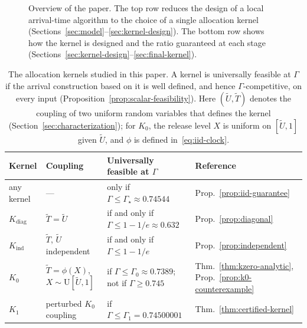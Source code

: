 \documentclass[11pt]{article}
\theoremstyle{definition}
\theoremstyle{remark}
\begin{document}
\begin{figure}[t]
\caption{Overview of the paper. The top row reduces the design of a local arrival-time
algorithm to the choice of a single allocation kernel (Sections~\ref{sec:model}--\ref{sec:kernel-design}). The
bottom row shows how the kernel is designed and the ratio guaranteed at each stage
(Sections~\ref{sec:kernel-design}--\ref{sec:final-kernel}).}
\label{fig:roadmap}
\end{figure}

\begin{table}[t]
\centering
\small
\begin{tabular}{@{}l l l l@{}}
\toprule
Kernel & Coupling & Universally feasible at $\Gamma$ & Reference\\
\midrule
any kernel & --- & only if $\Gamma\le\Gamma_\star\approx0.74544$ &
  Prop.~\ref{prop:iid-guarantee}\\
$K_{\mathrm{diag}}$ & $\widetilde T=\widetilde U$ & if and only if $\Gamma\le1-1/e\approx0.632$ &
  Prop.~\ref{prop:diagonal}\\
$K_{\mathrm{ind}}$ & $\widetilde T$, $\widetilde U$ independent & if and only if
  $\Gamma\le1-1/e$ & Prop.~\ref{prop:independent}\\
$K_0$ & $\widetilde T=\phi(X)$, $X\sim\mathrm U[\widetilde U,1]$ & if $\Gamma\le\Gamma_0\approx0.7389$; not if
  $\Gamma\ge0.745$ & Thm.~\ref{thm:kzero-analytic}, Prop.~\ref{prop:k0-counterexample}\\
$K_1$ & perturbed $K_0$ coupling & if $\Gamma\le\Gamma_1=0.74500001$ &
  Thm.~\ref{thm:certified-kernel}\\
\bottomrule
\end{tabular}
\caption{The allocation kernels studied in this paper. A kernel is universally feasible
at $\Gamma$ if the arrival construction based on it is well defined, and hence
$\Gamma$-competitive, on every input (Proposition~\ref{prop:scalar-feasibility}). Here
$(\widetilde U,\widetilde T)$ denotes the coupling of two uniform random variables that
defines the kernel (Section~\ref{sec:characterization}); for $K_0$, the release level $X$ is
uniform on $[\widetilde U,1]$ given $\widetilde U$, and $\phi$ is defined in~\eqref{eq:iid-clock}.}
\label{tab:results}
\end{table}
\end{document}
